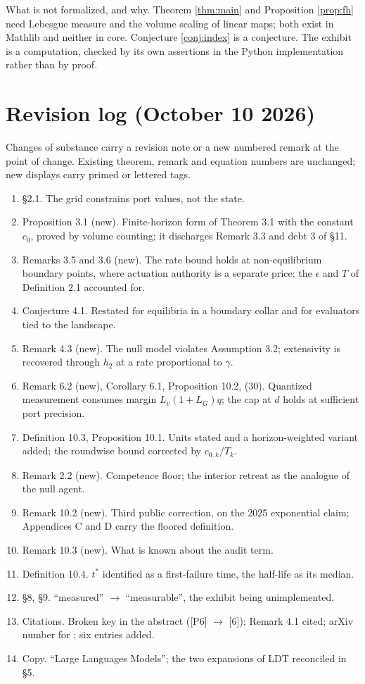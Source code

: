 \documentclass[11pt]{article}
\theoremstyle{definition}
\theoremstyle{remark}
\newcommand{\htwo}{h_2}
\begin{document}
What is not formalized, and why. Theorem \ref{thm:main} and Proposition \ref{prop:fh} need Lebesgue measure and the volume scaling of linear maps; both exist in Mathlib and neither in core. Conjecture \ref{conj:index} is a conjecture. The exhibit is a computation, checked by its own assertions in the Python implementation rather than by proof.

\section*{Revision log (October 10 2026)}
Changes of substance carry a revision note or a new numbered remark at the point of change. Existing theorem, remark and equation numbers are unchanged; new displays carry primed or lettered tags.
\begin{enumerate}
\item \S2.1. The grid constrains port values, not the state.
\item Proposition 3.1 (new). Finite-horizon form of Theorem 3.1 with the constant $c_0$, proved by volume counting; it discharges Remark 3.3 and debt 3 of \S11.
\item Remarks 3.5 and 3.6 (new). The rate bound holds at non-equilibrium boundary points, where actuation authority is a separate price; the $\epsilon$ and $T$ of Definition 2.1 accounted for.
\item Conjecture 4.1. Restated for equilibria in a boundary collar and for evaluators tied to the landscape.
\item Remark 4.3 (new). The null model violates Assumption 3.2; extensivity is recovered through $\htwo$ at a rate proportional to $\gamma$.
\item Remark 6.2 (new), Corollary 6.1, Proposition 10.2, (30). Quantized measurement consumes margin $L_v(1+L_G)q$; the cap at $d$ holds at sufficient port precision.
\item Definition 10.3, Proposition 10.1. Units stated and a horizon-weighted variant added; the roundwise bound corrected by $c_{0,k}/T_k$.
\item Remark 2.2 (new). Competence floor; the interior retreat as the analogue of the null agent.
\item Remark 10.2 (new). Third public correction, on the 2025 exponential claim; Appendices C and D carry the floored definition.
\item Remark 10.3 (new). What is known about the audit term.
\item Definition 10.4. $t^*$ identified as a first-failure time, the half-life as its median.
\item \S8, \S9. ``measured'' $\to$ ``measurable'', the exhibit being unimplemented.
\item Citations. Broken key in the abstract ([P6] $\to$ [6]); Remark 4.1 cited; arXiv number for \cite{musat2026}; six entries added.
\item Copy. ``Large Languages Models''; the two expansions of LDT reconciled in \S5.
\end{enumerate}
\end{document}
